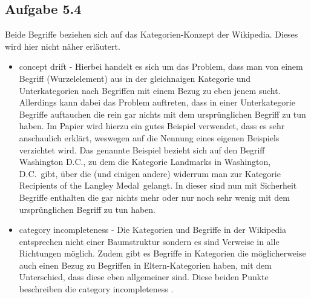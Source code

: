 \subsection*{Aufgabe 5.4}
Beide Begriffe beziehen sich auf das Kategorien-Konzept der Wikipedia. Dieses wird hier nicht näher erläutert.
\begin{itemize}
\item concept drift - Hierbei handelt es sich um das Problem, dass man von einem Begriff (Wurzelelement) aus in der gleichnaigen Kategorie und Unterkategorien nach Begriffen mit einem Bezug zu eben jenem sucht. Allerdings kann dabei das Problem auftreten, dass in einer Unterkategorie Begriffe auftauchen die rein gar nichts mit dem ursprünglichen Begriff zu tun haben. Im Papier wird hierzu ein gutes Beispiel verwendet, dass es sehr anschaulich erklärt, weswegen auf die Nennung eines eigenen Beispiels verzichtet wird. Das genannte Beispiel bezieht sich auf den Begriff \glqq Washington D.C.\grqq , zu dem die Kategorie \glqq Landmarks in Washington, D.C.\grqq \ gibt, über die (und einigen andere) widerrum man zur Kategorie \glqq Recipients of the Langley Medal\grqq \ gelangt. In dieser sind nun mit Sicherheit Begriffe enthalten die gar nichts mehr oder nur noch sehr wenig mit dem ursprünglichen Begriff zu tun haben.
\item category incompleteness - Die Kategorien und Begriffe in der Wikipedia entsprechen nicht einer Baumstruktur sondern es sind Verweise in alle Richtungen möglich. Zudem gibt es Begriffe in Kategorien die möglicherweise auch einen Bezug zu Begriffen in Eltern-Kategorien haben, mit dem Unterschied, dass diese eben allgemeiner sind. Diese beiden Punkte beschreiben die \glqq category incompleteness \grqq . 
\end{itemize}
